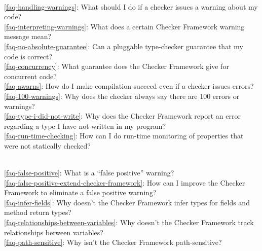 \\ \ref{faq-handling-warnings}: What should I do if a checker issues a warning about my code?
\\ \ref{faq-interpreting-warnings}: What does a certain Checker Framework warning message mean?
\\ \ref{faq-no-absolute-guarantee}: Can a pluggable type-checker guarantee that my code is correct?
\\ \ref{faq-concurrency}: What guarantee does the Checker Framework give for concurrent code?
\\ \ref{faq-awarns}: How do I make compilation succeed even if a checker issues errors?
\\ \ref{faq-100-warnings}: Why does the checker always say there are 100 errors or warnings?
\\ \ref{faq-type-i-did-not-write}: Why does the Checker Framework report an error regarding a type I have not written in my program?
\\ \ref{faq-run-time-checking}: How can I do run-time monitoring of properties that were not statically checked?

\\ \ref{faq-false-positive}: What is a ``false positive'' warning?
\\ \ref{faq-false-positive-extend-checker-framework}: How can I improve the Checker Framework to eliminate a false positive warning?
\\ \ref{faq-infer-fields}: Why doesn't the Checker Framework infer types for fields and method return types?
\\ \ref{faq-relationships-between-variables}: Why doesn't the Checker Framework track relationships between variables?
\\ \ref{faq-path-sensitive}: Why isn't the Checker Framework path-sensitive?

